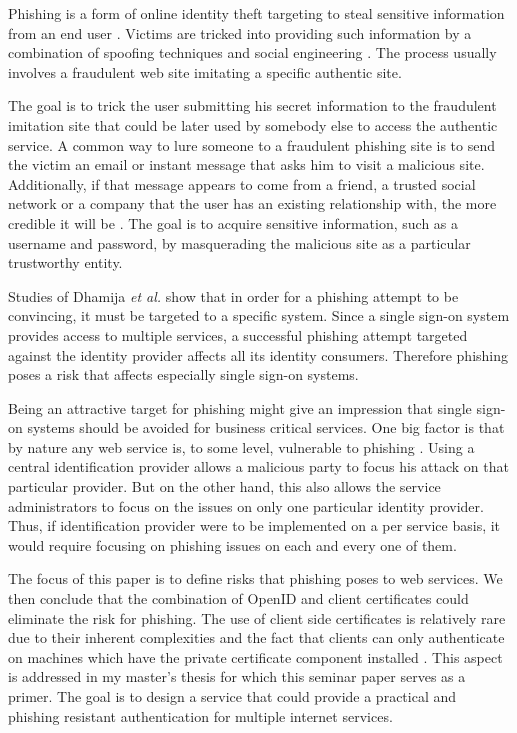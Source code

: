 \documentclass[english,gradu]{tktltiki}
\begin{document}
    Phishing is a form of online identity theft targeting to steal sensitive information from an end user   \cite{phishing_attacks_and_solutions_2007, why_phishing_works_06, suspectibility_to_phishing_2006}. Victims are tricked into providing such information by a combination of spoofing techniques and social engineering \cite{visual_similarity_phishing_2008}. The process usually involves a fraudulent web site imitating a specific authentic site.

    The goal is to trick the user submitting his secret information to the fraudulent imitation site that could be later used by somebody else to access the authentic service. A common way to lure someone to a fraudulent phishing site is to send the victim an email or instant message that asks him to visit a malicious site. Additionally, if that message appears to come from a friend, a trusted social network or a company that the user has an existing relationship with, the more credible it will be \cite{suspectibility_to_phishing_2006}. The goal is to acquire sensitive information, such as a username and password, by masquerading the malicious site as a particular trustworthy entity.

    Studies of Dhamija \emph{et al.} \cite{why_phishing_works_06} show that in order for a phishing attempt to be convincing, it must be targeted to a specific system. Since a single sign-on system provides access to multiple services, a successful phishing attempt targeted against the identity provider affects all its identity consumers. Therefore phishing poses a risk that affects especially single sign-on systems.

    Being an attractive target for phishing might give an impression that single sign-on systems should be avoided for business critical services. One big factor is that by nature any web service is, to some level, vulnerable to phishing \cite{why_phishing_works_06}. Using a central identification provider allows a malicious party to focus his attack on that particular provider. But on the other hand, this also allows the service administrators to focus on the issues on only one particular identity provider. Thus, if identification provider were to be implemented on a per service basis, it would require focusing on phishing issues on each and every one of them.

    The focus of this paper is to define risks that phishing poses to web services. We then conclude that the combination of OpenID and client certificates could eliminate the risk for phishing. The use of client side certificates is relatively rare due to their inherent complexities and the fact that clients can only authenticate on machines which have the private certificate component installed \cite{owasp_tls_cheatsheet}. This aspect is addressed in my master's thesis for which this seminar paper serves as a primer. The goal is to design a service that could provide a practical and phishing resistant authentication for multiple internet services.
\end{document}
